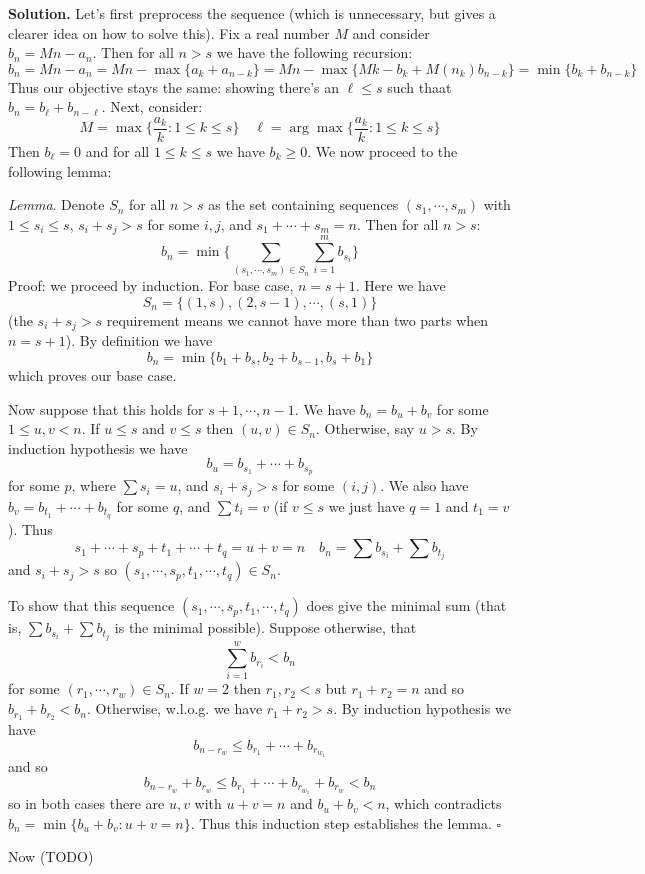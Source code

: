 \documentclass[11pt]{article}
\newcommand{\<}{\langle}
\renewcommand{\>}{\rangle}
\begin{document}
\begin{enumerate}
	\textbf{Solution.} 
	Let's first preprocess the sequence (which is unnecessary, but gives a clearer idea on how to solve this). 
	Fix a real number $M$ and consider $b_n=Mn-a_n$. Then for all $n>s$ we have the following recursion: 
	\[
	b_n = Mn - a_n = Mn - \max \{a_k + a_{n-k}\}
	= Mn - \max \{Mk  - b_k + M(n_k) b_{n-k}\}
	= \min \{b_k + b_{n-k}\}
	\]
	Thus our objective stays the same: showing there's an $\ell\le s$ such thaat $b_n=b_{\ell}+b_{n-\ell}$. 
	Next, consider: 
	\[
	M = \max \{\frac{a_k}{k}: 1\le k\le s\}
	\quad 
	\ell = \arg\max \{\frac{a_k}{k}: 1\le k\le s\}
	\]
	Then $b_{\ell}=0$ and for all $1\le k\le s$ we have $b_{k}\ge 0$. 
	We now proceed to the following lemma: 
	
	\emph{Lemma}. Denote $S_n$ for all $n>s$ as the set containing sequences $(s_1, \cdots, s_{m})$ with $1\le s_i\le s$, $s_i+s_j>s$ for some $i, j$, and $s_1+\cdots + s_m = n$. Then for all $n>s$: 
	\[
	b_n = \min\{\sum_{(s_1, \cdots, s_{m})\in S_n}\sum_{i=1}^m b_{s_i}\}
	\]
	Proof: we proceed by induction. For base case, $n=s+1$. Here we have 
	\[
	S_n = \{(1, s), (2, s-1), \cdots, (s, 1)\}
	\]
	(the $s_i+s_j>s$ requirement means we cannot have more than two parts when $n=s+1$). 
	By definition we have 
	\[
	b_n = \min \{b_1+b_s, b_2 + b_{s-1}, b_s+b_1\}
	\]
	which proves our base case. 
	
	Now suppose that this holds for $s+1, \cdots, n-1$. 
	We have $b_n = b_u + b_{v}$ for some $1\le u, v<n$. 
	If $u\le s$ and $v\le s$ then $(u, v)\in S_n$. 
	Otherwise, say $u>s$. 
	By induction hypothesis we have 
	\[
	b_u = b_{s_1}+\cdots + b_{s_p}
	\]
	for some $p$, where $\sum s_i = u$, and $s_i+s_j>s$ for some $(i, j)$. 
	We also have $b_v = b_{t_1}+\cdots + b_{t_q}$ for some $q$, 
	and $\sum t_i=v$ (if $v\le s$ we just have $q=1$ and $t_1=v$). 
	Thus 
	\[
	s_1+\cdots + s_p + t_1+\cdots + t_q = u + v = n
	\quad 
	b_n = \sum b_{s_i} + \sum b_{t_j}
	\]
	and $s_i+s_j>s$ so $(s_1, \cdots, s_p, t_1, \cdots, t_q)\in S_n$. 
	
	To show that this sequence $(s_1, \cdots, s_p, t_1, \cdots, t_q)$ does give the minimal sum 
	(that is, $\sum b_{s_i} + \sum b_{t_j}$ is the minimal possible). 
	Suppose otherwise, that 
	\[
	\sum_{i=1}^w b_{r_i} < b_n
	\]
	for some $(r_1, \cdots, r_w)\in S_n$. 
	If $w=2$ then $r_1, r_2<s$ but $r_1+r_2=n$ and so $b_{r_1}+b_{r_2}<b_n$. 
	Otherwise, w.l.o.g. we have $r_1+r_2>s$. 
	By induction hypothesis we have 
	\[
	b_{n-r_w}\le b_{r_1}+\cdots + b_{r_{w_1}}
	\]
	and so 
	\[
	b_{n-r_w}+b_{r_w}
	\le b_{r_1}+\cdots + b_{r_{w_1}} + b_{r_w}
	< b_n
	\]
	so in both cases there are $u, v$ with $u+v=n$ and $b_u+b_v<n$, which contradicts 
	$b_n = \min \{b_u+b_v: u+v=n\}$. 
	Thus this induction step establishes the lemma. $\square$
	
	Now (TODO)
	
\end{enumerate}
	
\end{document}
